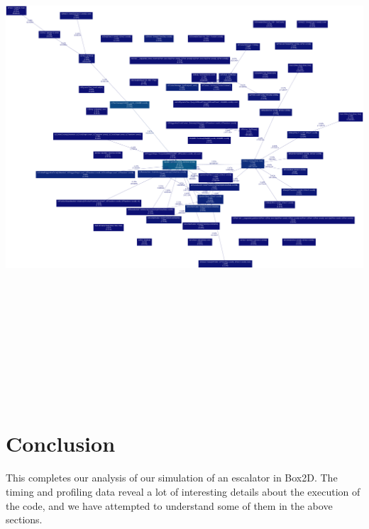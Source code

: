 \documentclass[11pt]{article}
\begin{document}
	\includegraphics[width=525pt, height=525pt]{../plots/improved_graph_5000.png}\\\\

\section{Conclusion}

	This completes our analysis of our simulation of an escalator in Box2D. The timing and profiling data reveal a lot of interesting details about the execution of the code, and we have attempted to understand some of them in the above sections.


\end{document}
